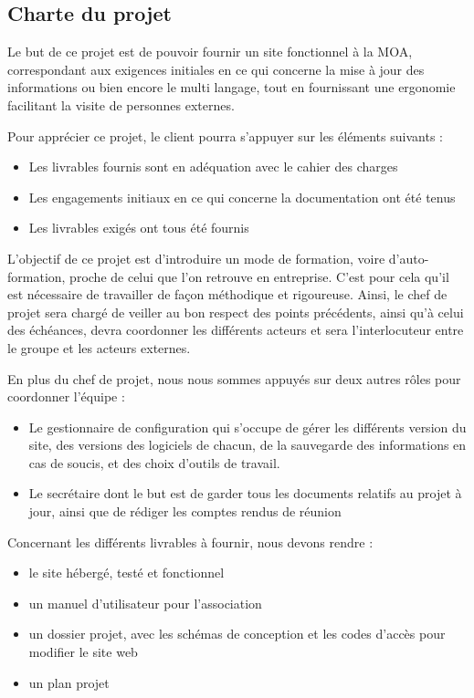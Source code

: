 \documentclass[11pt]{report}
\begin{document}
\subsection{Charte du projet}
Le but de ce projet est de pouvoir fournir un site fonctionnel à la MOA, 
correspondant aux exigences initiales en ce qui concerne la mise à jour des 
informations ou bien encore le multi langage, tout en fournissant une 
ergonomie facilitant la visite de personnes externes.\\

\par Pour apprécier ce projet, le client pourra s'appuyer sur les éléments 
suivants : 
\begin{itemize}
    \item Les livrables fournis sont en adéquation avec le cahier des charges
    \item Les engagements initiaux en ce qui concerne la documentation ont été 
tenus
    \item Les livrables exigés ont tous été fournis\\
\end{itemize}

\par L'objectif de ce projet est d'introduire un mode de formation, voire 
d'auto-formation, proche de celui que l'on retrouve en entreprise. C'est pour 
cela qu'il est nécessaire de travailler de façon méthodique et rigoureuse. 
Ainsi, le chef de projet sera chargé de veiller au bon respect des points 
précédents, ainsi qu'à celui des échéances, devra coordonner les différents 
acteurs et sera l'interlocuteur entre le groupe et les acteurs externes.\\

\par En plus du chef de projet, nous nous sommes appuyés sur deux autres rôles 
pour coordonner l'équipe : 
\begin{itemize}
    \item Le gestionnaire de configuration qui s'occupe de gérer les différents 
version du site, des versions des logiciels de chacun, de la sauvegarde des 
informations en cas de soucis, et des choix d'outils de travail.
    \item Le secrétaire dont le but est de garder tous les documents relatifs 
au projet à jour, ainsi que de rédiger les comptes rendus de réunion\\
\end{itemize}

\par Concernant les différents livrables à fournir, nous devons rendre : 
    \begin{itemize}
    \item le site hébergé, testé et fonctionnel
    \item un manuel d'utilisateur pour l’association
    \item un dossier projet, avec les schémas de conception et les codes d'accès 
pour modifier le site web
    \item un plan projet
    \end{itemize}
\end{document}
